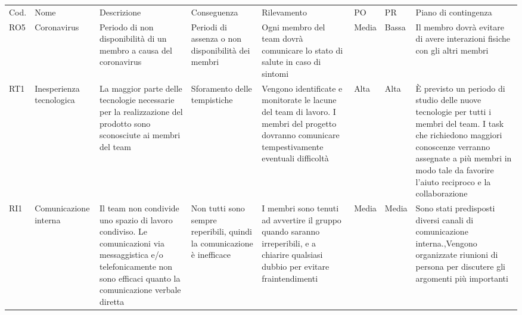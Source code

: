 \begin{landscape}
\begin{table}[h]
\begin{center}
\begin{tabular}{p{0.6cm}|p{1.8cm}|p{4cm}|p{2cm}|p{4cm}|p{0.9cm}|p{0.8cm}|p{4cm}}
\end{tabular}
\end{center}
\end{table}
\begin{table}[h]
\begin{center}
\begin{tabular}{p{0.6cm}|p{1.8cm}|p{4cm}|p{2cm}|p{4cm}|p{0.9cm}|p{0.8cm}|p{4cm}}
Cod. & Nome                & Descrizione    & Conseguenza                  & Rilevamento                                                                                                                                                                    & PO & PR & Piano di contingenza                                                                                                                                                                                             \\
RO5 & Coronavirus  & Periodo di non disponibilità di un membro a causa del coronavirus & Periodi di assenza o non disponibilità dei membri & Ogni membro del team dovrà comunicare lo stato di salute in caso di sintomi & Media & Bassa & Il membro dovrà evitare di avere interazioni fisiche con gli altri membri \\
RT1 & Inesperienza tecnologica & La maggior parte delle tecnologie necessarie per la realizzazione del prodotto sono sconosciute ai membri del team & Sforamento delle tempistiche & Vengono identificate e monitorate le lacune del team di lavoro. I membri del progetto dovranno comunicare tempestivamente eventuali difficoltà & Alta & Alta & È previsto un periodo di studio delle nuove tecnologie per tutti i membri del team. I task che richiedono maggiori conoscenze verranno assegnate a più membri in modo tale da favorire l’aiuto reciproco e la collaborazione \\                                                                                                                                                                                                                              
RI1 & Comunicazione interna & Il team non condivide uno spazio di lavoro condiviso. Le comunicazioni via messaggistica e/o telefonicamente non sono efficaci quanto la comunicazione verbale diretta & Non tutti sono sempre reperibili, quindi la comunicazione è inefficace & I membri sono tenuti ad avvertire il gruppo quando saranno irreperibili, e a chiarire qualsiasi dubbio per evitare fraintendimenti & Media & Media & Sono stati predisposti diversi canali di comunicazione interna.,Vengono organizzate riunioni di persona per discutere gli argomenti più importanti       \\

\end{tabular}
\end{center}
\end{table}
\end{landscape}
